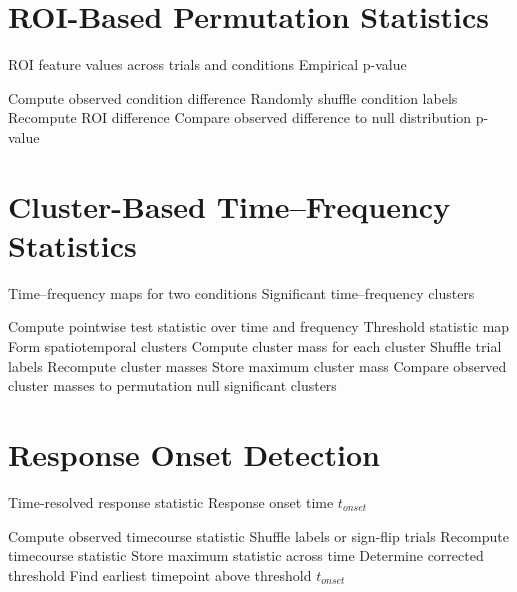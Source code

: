 \documentclass[11pt]{report}
\begin{document}
\section{ROI-Based Permutation Statistics}

\begin{algorithm}[H]
\caption{ROI permutation test}
\begin{algorithmic}[1]
\Require ROI feature values across trials and conditions
\Ensure Empirical p-value

\State Compute observed condition difference
    \State Randomly shuffle condition labels
    \State Recompute ROI difference
\EndFor
\State Compare observed difference to null distribution
\State \Return p-value
\end{algorithmic}
\end{algorithm}

\section{Cluster-Based Time--Frequency Statistics}

\begin{algorithm}[H]
\caption{Cluster-based time--frequency permutation test}
\begin{algorithmic}[1]
\Require Time--frequency maps for two conditions
\Ensure Significant time--frequency clusters

\State Compute pointwise test statistic over time and frequency
\State Threshold statistic map
\State Form spatiotemporal clusters
\State Compute cluster mass for each cluster
    \State Shuffle trial labels
    \State Recompute cluster masses
    \State Store maximum cluster mass
\EndFor
\State Compare observed cluster masses to permutation null
\State \Return significant clusters
\end{algorithmic}
\end{algorithm}

\section{Response Onset Detection}

\begin{algorithm}[H]
\caption{Permutation-based onset estimation}
\begin{algorithmic}[1]
\Require Time-resolved response statistic
\Ensure Response onset time $t_{onset}$

\State Compute observed timecourse statistic
    \State Shuffle labels or sign-flip trials
    \State Recompute timecourse statistic
    \State Store maximum statistic across time
\EndFor
\State Determine corrected threshold
\State Find earliest timepoint above threshold
\State \Return $t_{onset}$
\end{algorithmic}
\end{algorithm}
\end{document}
